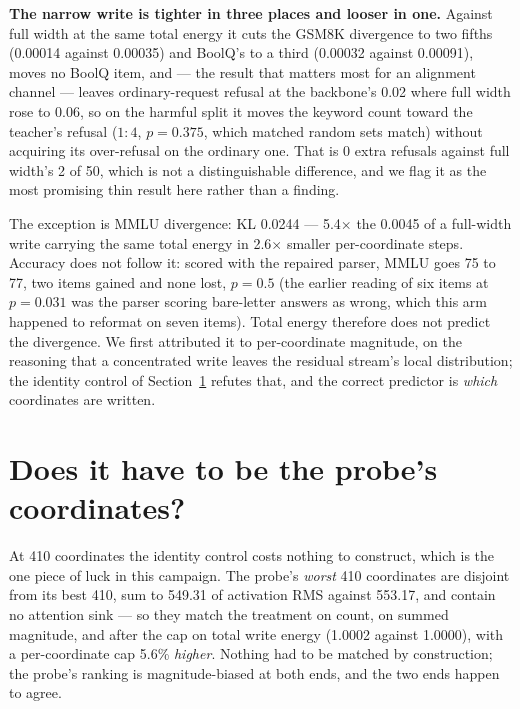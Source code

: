 \documentclass[11pt]{article}
\begin{document}
\textbf{The narrow write is tighter in three places and looser in one.} Against full
width at the same total energy it cuts the GSM8K divergence to two fifths (0.00014
against 0.00035) and BoolQ's to a third (0.00032 against 0.00091), moves no BoolQ item, and
--- the result that matters most for an alignment channel --- leaves ordinary-request
refusal at the backbone's 0.02 where full width rose to 0.06, so on the harmful
split it moves the keyword count toward the teacher's refusal ($1{:}4$, $p = 0.375$,
which matched random sets match) without acquiring its over-refusal on the
ordinary one. That is 0 extra refusals against full width's 2 of 50, which is not a
distinguishable difference, and we flag it as the most promising thin result here
rather than a finding.

The exception is MMLU divergence: KL 0.0244 --- 5.4$\times$ the 0.0045 of a full-width
write carrying the same total energy in 2.6$\times$ smaller per-coordinate steps.
Accuracy does not follow it: scored with the repaired parser, MMLU goes 75 to 77, two
items gained and none lost, $p = 0.5$ (the earlier reading of six items at $p = 0.031$
was the parser scoring bare-letter answers as wrong, which this arm happened to
reformat on seven items). Total energy therefore does not predict the divergence. We first attributed it to
per-coordinate magnitude, on the reasoning that a concentrated write leaves the
residual stream's local distribution; the identity control of
Section~\ref{sec:identity} refutes that, and the correct predictor is \emph{which}
coordinates are written.


\section{Does it have to be the probe's coordinates?}
\label{sec:identity}

At 410 coordinates the identity control costs nothing to construct, which is the
one piece of luck in this campaign. The probe's \emph{worst} 410 coordinates are
disjoint from its best 410, sum to 549.31 of activation RMS against 553.17, and
contain no attention sink --- so they match the treatment on count, on summed
magnitude, and after the cap on total write energy (1.0002 against 1.0000), with a
per-coordinate cap 5.6\% \emph{higher}. Nothing had to be matched by construction;
the probe's ranking is magnitude-biased at both ends, and the two ends happen to
agree.
\end{document}
